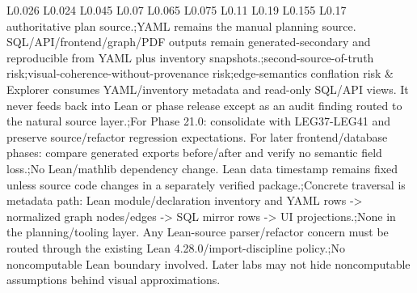 \begin{longtable}{L{0.026\linewidth} L{0.024\linewidth} L{0.045\linewidth} L{0.07\linewidth} L{0.065\linewidth} L{0.075\linewidth} L{0.11\linewidth} L{0.19\linewidth} L{0.155\linewidth} L{0.17\linewidth}}
authoritative plan source.;\newline YAML remains the manual planning source. SQL/\allowbreak{}API/\allowbreak{}frontend/\allowbreak{}graph/\allowbreak{}PDF outputs remain generated-secondary and reproducible from YAML plus inventory snapshots.;\newline second-source-of-truth risk;\newline visual-coherence-without-provenance risk;\newline edge-semantics conflation risk & Explorer consumes YAML/\allowbreak{}inventory metadata and read-only SQL/\allowbreak{}API views. It never feeds back into Lean or phase release except as an audit finding routed to the natural source layer.;\newline For Phase 21.0: consolidate with LEG37-LEG41 and preserve source/\allowbreak{}refactor regression expectations. For later frontend/\allowbreak{}database phases: compare generated exports before/\allowbreak{}after and verify no semantic field loss.;\newline No Lean/\allowbreak{}mathlib dependency change. Lean data timestamp remains fixed unless source code changes in a separately verified package.;\newline Concrete traversal is metadata path: Lean module/\allowbreak{}declaration inventory and YAML rows -> normalized graph nodes/\allowbreak{}edges -> SQL mirror rows -> UI projections.;\newline None in the planning/\allowbreak{}tooling layer. Any Lean-source parser/\allowbreak{}refactor concern must be routed through the existing Lean 4.28.0/\allowbreak{}import-discipline policy.;\newline No noncomputable Lean boundary involved. Later labs may not hide noncomputable assumptions behind visual approximations.\\
\hline
\addlinespace[0.24em]

\end{longtable}
